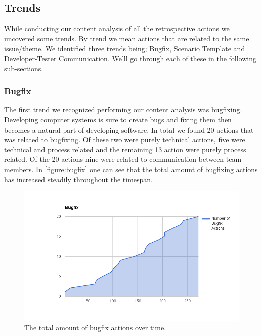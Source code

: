 \subsection{Trends}
While conducting our content analysis of all the retrospective actions we uncovered some trends. By trend we mean actions that are related to the same issue/theme. We identified three trends being; Bugfix, Scenario Template and Developer-Tester Communication. We'll go through each of these in the following sub-sections. 

\subsubsection{Bugfix}
The first trend we recognized performing our content analysis was bugfixing. Developing computer systems is sure to create bugs and fixing them then becomes a natural part of developing software. In total we found 20 actions that was related to bugfixing. Of these two were purely technical actions, five were technical and process related and the remaining 13 action were purely process related. Of the 20 actions nine were related to communication between team members. In \autoref{figure:bugfix} one can see that the total amount of bugfixing actions has increased steadily throughout the timespan. 

\begin{figure}[!h]
	\centering
	\includegraphics[width=\textwidth, keepaspectratio]{figures/bugfix.png}
	\caption{The total amount of bugfix actions over time.}
	\label{figure:bugfix}
\end{figure}

